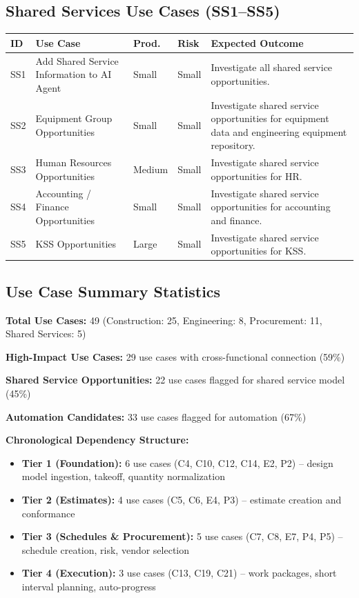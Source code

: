 \documentclass[11pt, letterpaper]{article}
\begin{document}
\vspace{1em}

\subsection*{Shared Services Use Cases (SS1--SS5)}

{\footnotesize
\setlength{\tabcolsep}{4pt}
\begin{tabularx}{\textwidth}{@{} >{\raggedright\arraybackslash}p{0.9cm} >{\raggedright\arraybackslash}p{3.8cm} >{\raggedright\arraybackslash}p{1.3cm} >{\raggedright\arraybackslash}p{1.3cm} X @{}}
\toprule
\textbf{ID} & \textbf{Use Case} & \textbf{Prod.} & \textbf{Risk} & \textbf{Expected Outcome} \\
\midrule
SS1 & Add Shared Service Information to AI Agent & Small & Small & Investigate all shared service opportunities. \\
\midrule
SS2 & Equipment Group Opportunities & Small & Small & Investigate shared service opportunities for equipment data and engineering equipment repository. \\
\midrule
SS3 & Human Resources Opportunities & Medium & Small & Investigate shared service opportunities for HR. \\
\midrule
SS4 & Accounting / Finance Opportunities & Small & Small & Investigate shared service opportunities for accounting and finance. \\
\midrule
SS5 & KSS Opportunities & Large & Small & Investigate shared service opportunities for KSS. \\
\bottomrule
\end{tabularx}
}

\vspace{1em}

\subsection*{Use Case Summary Statistics}

\textbf{Total Use Cases:} 49 (Construction: 25, Engineering: 8, Procurement: 11, Shared Services: 5)

\textbf{High-Impact Use Cases:} 29 use cases with cross-functional connection (59\%)

\textbf{Shared Service Opportunities:} 22 use cases flagged for shared service model (45\%)

\textbf{Automation Candidates:} 33 use cases flagged for automation (67\%)

\textbf{Chronological Dependency Structure:}
\begin{itemize}
    \item \textbf{Tier 1 (Foundation):} 6 use cases (C4, C10, C12, C14, E2, P2) -- design model ingestion, takeoff, quantity normalization
    \item \textbf{Tier 2 (Estimates):} 4 use cases (C5, C6, E4, P3) -- estimate creation and conformance
    \item \textbf{Tier 3 (Schedules \& Procurement):} 5 use cases (C7, C8, E7, P4, P5) -- schedule creation, risk, vendor selection
    \item \textbf{Tier 4 (Execution):} 3 use cases (C13, C19, C21) -- work packages, short interval planning, auto-progress
\end{itemize}
\end{document}
